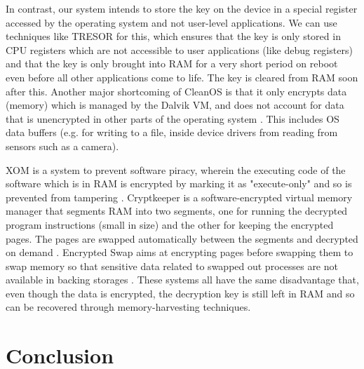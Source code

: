 \documentclass[conference,10pt]{IEEEtran}
\begin{document}
In contrast, our system intends to store the key on the device in a special register accessed by the 
operating system and not user-level applications. We can use techniques like TRESOR \cite{tresor} for this, 
which ensures that the key is only stored in CPU registers which are not accessible to user applications 
(like debug registers) and that the key is only brought into RAM for a very short period on reboot even 
before all other applications come to life. The key is cleared from RAM soon after this.  Another major 
shortcoming of CleanOS is that it only encrypts data (memory) which is managed by the Dalvik VM, and does not account for data that is unencrypted in other parts of the operating system 
\cite{cleanos}.  This includes OS data buffers (e.g. for writing to a file, inside device drivers from 
reading from sensors such as a camera).

XOM is a system to prevent software piracy, wherein the executing code of the software which is in RAM is 
encrypted by marking it as "execute-only" and so is prevented from tampering \cite{xom}.  Cryptkeeper is a 
software-encrypted virtual memory manager that segments RAM into two segments, one for running the 
decrypted program instructions (small in size) and the other for keeping the encrypted pages. The pages 
are swapped automatically between the segments and decrypted on demand \cite{cryptkeeper}.  Encrypted Swap 
aims at encrypting pages before swapping them to swap memory so that sensitive data related to swapped out 
processes are not available in backing storages \cite{encryptedswap}. These systems all have the same 
disadvantage that, even though the data is encrypted, the decryption key is still left in RAM and so can be 
recovered through memory-harvesting techniques.

\section{Conclusion}
\end{document}
